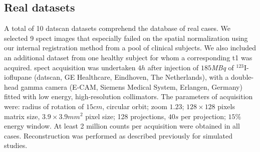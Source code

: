 \documentclass{frontiers}
\begin{document}
\subsection{Real datasets} %
\label{sec:data_real}
\cbstart
A total of 10 \gls*{datscan} datasets comprehend the database of real cases.
We selected 9 \gls*{spect} images that especially failed on the spatial normalization
  using our internal registration method from a pool of clinical subjects.
We also included an additional dataset from one healthy subject for whom
  a corresponding \acrlong*{t1} was acquired.
\cbend
\Gls*{spect} acquisition was undertaken $4h$
  after injection  of $185$\textit{MBq} of $^{123}$I-ioflupane
  (\Gls*{datscan}, GE Healthcare, Eindhoven, The Netherlands),
  with a  double-head gamma camera (E-CAM, Siemens Medical System,
  Erlangen, Germany) fitted with low energy, high-resolution collimators.
The parameters of acquisition were: radius of rotation of $15cm$,
  circular orbit; zoom $1.23$; $128\times128$
  pixels matrix size, $3.9\times3.9mm^{2}$ pixel size;
  128 projections, $40s$ per projection; 
  $15\%$ energy window.
At least 2 million counts per acquisition were obtained in all cases.
Reconstruction was performed as described previously for simulated studies.
\end{document}
